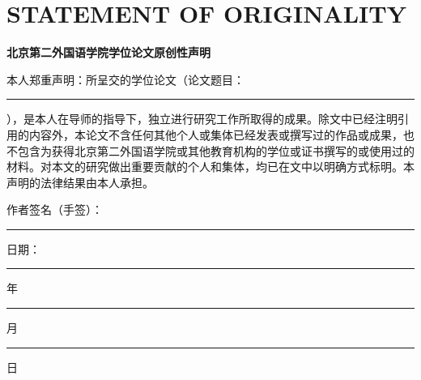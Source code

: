 
\chapter*{STATEMENT OF ORIGINALITY}

\begin{center}
\textbf{北京第二外国语学院学位论文原创性声明}
\end{center}

\noindent
本人郑重声明：所呈交的学位论文（论文题目：\rule{8cm}{0.4pt}），是本人在导师的指导下，独立进行研究工作所取得的成果。除文中已经注明引用的内容外，本论文不含任何其他个人或集体已经发表或撰写过的作品或成果，也不包含为获得北京第二外国语学院或其他教育机构的学位或证书撰写的或使用过的材料。对本文的研究做出重要贡献的个人和集体，均已在文中以明确方式标明。本声明的法律结果由本人承担。

\vspace{2cm}

\hfill 作者签名（手签）：\rule{4cm}{0.4pt}

\hfill 日期：\rule{1.5cm}{0.4pt} 年 \rule{1cm}{0.4pt} 月 \rule{1cm}{0.4pt} 日
